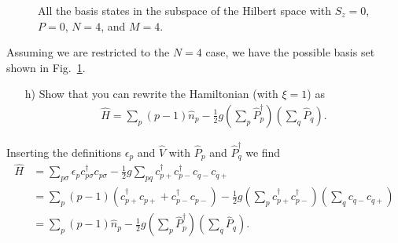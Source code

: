 \documentclass[a4paper]{article}
\newcommand{\fig}[1]{Fig.\ \ref{fig:#1}}
\newcommand{\nn}{\nonumber}
\renewcommand{\i}{\hat{\imath}}
\newcommand{\ps}{{p\sigma}}
\newcommand{\cpp}{c_{p+}}
\newcommand{\cppd}{c_{p+}^\dagger}
\newcommand{\cpm}{c_{p-}}
\newcommand{\cpmd}{c_{p-}^\dagger}
\newcommand{\cqp}{c_{q+}}
\newcommand{\cqm}{c_{q-}}
\begin{document}
\begin{figure}
\begin{center}
\end{center}
\caption{All the basis states in the subspace of the Hilbert space with $S_z=0$, $P=0$, $N=4$, and $M=4$. \label{fig:10}}
\end{figure}
Assuming we are restricted to the $N=4$ case, we have the possible basis set shown in \fig{10}.


\begin{exframe}
\begin{itemize}
  \item[h)] Show that you can rewrite the Hamiltonian (with $\xi=1$) as 
  \begin{align}
  \hat H = \sum_p (p-1)\hat n_p - \frac{1}{2}g \left( \sum_p \hat P^\dagger_p \right) \left( \sum_q \hat P_q  \right).
  \end{align}
\end{itemize}
\end{exframe}
Inserting the definitions $\epsilon_p$ and $\hat V$ with $\hat P_p$ and $\hat P^\dagger_q$ we find
\begin{align}
\hat H &= \sum_\ps \epsilon_p c_\ps^\dagger c_\ps - \frac{1}{2}g \sum_{pq} \cppd \cpmd \cqm \cqp \nn\\
%
&= \sum_p (p-1) \left(\cppd \cpp + \cpmd \cpm \right) - \frac{1}{2}g \left(\sum_p\cppd \cpmd \right) \left( \sum_q \cqm \cqp \right) \nn\\
%
&= \sum_p (p-1) \hat n_p - \frac{1}{2}g \left(\sum_p\hat P_p^\dagger\right) \left( \sum_q \hat P_q\right).
\end{align}

\newpage
\end{document}
